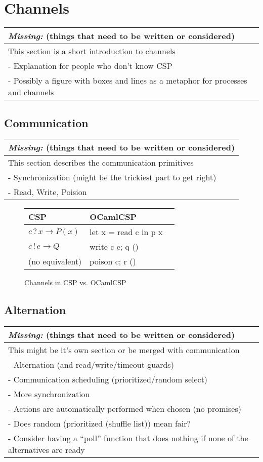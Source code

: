 \documentclass[11pt,oneside,a4paper]{article}
\newcommand{\missing}[1]{
\begin{tabular}{|p{11cm}|}
\hline
\emph{Missing:} {\scriptsize (things that need to be written or considered)} \\
\hline
#1
\hline
\end{tabular}
}
\begin{document}
\section{Channels}
\missing{
This section is a short introduction to channels \\
- Explanation for people who don't know CSP \\
- Possibly a figure with boxes and lines as a metaphor for processes and channels \\
}

\subsection{Communication}
\missing{
This section describes the communication primitives \\
- Synchronization (might be the trickiest part to get right) \\
- Read, Write, Poision \\
}

\begin{figure}[h]
\centering
\begin{tabular}{l|l|l}
CSP & OCamlCSP \\
\hline
$c\,?\,x \to P(x)$ & let x = read c in p x \\
$c\,!\,e \to Q$ & write c e; q () \\
(no equivalent) & poison c; r () \\
\end{tabular}
\caption{Channels in CSP vs. OCamlCSP}
\label{channel-communication}
\end{figure}

\subsection{Alternation}
\missing{
This might be it's own section or be merged with communication \\
- Alternation (and read/write/timeout guards) \\
- Communication scheduling (prioritized/random select) \\
- More synchronization \\
- Actions are automatically performed when chosen (no promises) \\
- Does random (prioritized (shuffle list)) mean fair? \\
- Consider having a ``poll'' function that does nothing if none of the alternatives are ready \\
}
\end{document}
